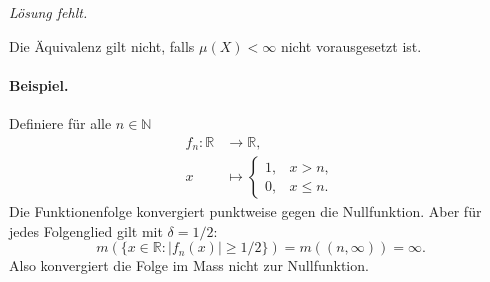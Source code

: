 \documentclass[10pt]{article}\usepackage[]{graphicx}\usepackage[]{color}
\newtheorem*{lemma}{Lemma}
\newcommand{\N}{\mathbb{N}}
\newcommand{\R}{\mathbb{R}}
\begin{document}
\begin{enumerate}[(a)]
  \textit{Lösung fehlt.}
  
  Die Äquivalenz gilt nicht, falls $\mu(X) < \infty$
  nicht vorausgesetzt ist.

  \paragraph{Beispiel.} Definiere für alle $n \in \N$
  \begin{align*}
    f_n : \R &\to \R,\\
          x &\mapsto \begin{cases}
            1, &x > n, \\
            0, &x \leq n.
          \end{cases}
  \end{align*}
  Die Funktionenfolge konvergiert punktweise 
  gegen die Nullfunktion. Aber für jedes Folgenglied
  gilt mit $\delta = 1/2$:
  \[
    m(\{x \in \R : |f_n(x)| \geq 1/2\}) = m((n, \infty)) = \infty.
  \]
  Also konvergiert die Folge im Mass nicht zur Nullfunktion. 
\end{enumerate}
\end{document}
